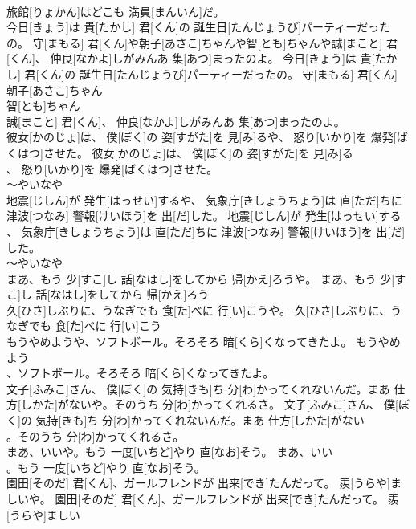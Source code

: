 \documentclass[8pt]{extreport}
\begin{document}
\begin{CJK}{UTF8}{min}
\\	旅館[りょかん]はどこも 満員[まんいん]だ。	
\\	今日[きょう]は 貴[たかし] 君[くん]の 誕生日[たんじょうび]パーティーだったの。 守[まもる] 君[くん]や朝子[あさこ]ちゃんや智[とも]ちゃんや誠[まこと] 君[くん]、 仲良[なかよ]しがみんあ 集[あつ]まったのよ。	今日[きょう]は 貴[たかし] 君[くん]の 誕生日[たんじょうび]パーティーだったの。 守[まもる] 君[くん]
\\	朝子[あさこ]ちゃん
\\	智[とも]ちゃん
\\	誠[まこと] 君[くん]、 仲良[なかよ]しがみんあ 集[あつ]まったのよ。	
\\	彼女[かのじょ]は、 僕[ぼく]の 姿[すがた]を 見[み]るや、 怒り[いかり]を 爆発[ばくはつ]させた。	彼女[かのじょ]は、 僕[ぼく]の 姿[すがた]を 見[み]る
\\	、 怒り[いかり]を 爆発[ばくはつ]させた。	
\\	～やいなや 
\\	地震[じしん]が 発生[はっせい]するや、 気象庁[きしょうちょう]は 直[ただ]ちに 津波[つなみ] 警報[けいほう]を 出[だ]した。	地震[じしん]が 発生[はっせい]する
\\	、 気象庁[きしょうちょう]は 直[ただ]ちに 津波[つなみ] 警報[けいほう]を 出[だ]した。	
\\	～やいなや 
\\	まあ、もう 少[すこ]し 話[なはし]をしてから 帰[かえ]ろうや。	まあ、もう 少[すこ]し 話[なはし]をしてから 帰[かえ]ろう
\\	久[ひさ]しぶりに、うなぎでも 食[た]べに 行[い]こうや。	久[ひさ]しぶりに、うなぎでも 食[た]べに 行[い]こう
\\	もうやめようや、ソフトボール。そろそろ 暗[くら]くなってきたよ。	もうやめよう
\\	、ソフトボール。そろそろ 暗[くら]くなってきたよ。	
\\	文子[ふみこ]さん、 僕[ぼく]の 気持[きも]ち 分[わ]かってくれないんだ。まあ 仕方[しかた]がないや。そのうち 分[わ]かってくれるさ。	文子[ふみこ]さん、 僕[ぼく]の 気持[きも]ち 分[わ]かってくれないんだ。まあ 仕方[しかた]がない
\\	。そのうち 分[わ]かってくれるさ。	
\\	まあ、いいや。もう 一度[いちど]やり 直[なお]そう。	まあ、いい
\\	。もう 一度[いちど]やり 直[なお]そう。	
\\	園田[そのだ] 君[くん]、ガールフレンドが 出来[でき]たんだって。 羨[うらや]ましいや。	園田[そのだ] 君[くん]、ガールフレンドが 出来[でき]たんだって。 羨[うらや]ましい

\end{CJK}
\end{document}
